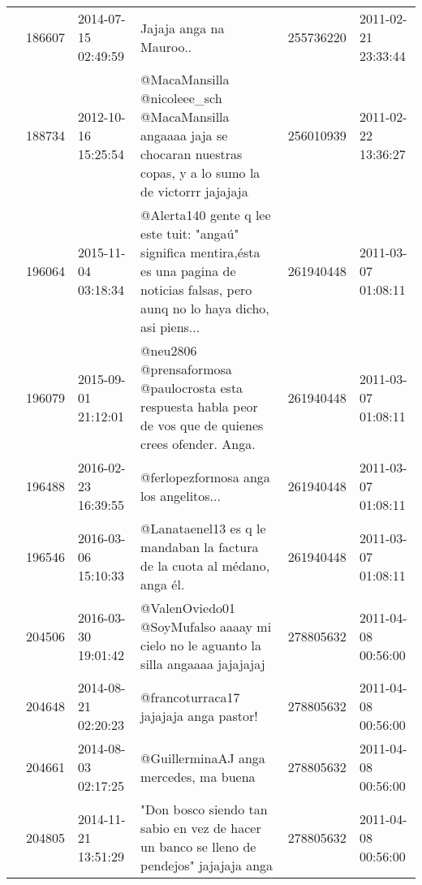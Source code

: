 \begin{tabular}{llllrl}
           & 186607  & 2014-07-15 02:49:59 &                                                                                                                      Jajaja anga na Mauroo.. &   255736220 & 2011-02-21 23:33:44 \\
           & 188734  & 2012-10-16 15:25:54 &                       @MacaMansilla @nicoleee\_sch @MacaMansilla angaaaa jaja se chocaran nuestras copas, y a lo sumo la de victorrr jajajaja &   256010939 & 2011-02-22 13:36:27 \\
           & 196064  & 2015-11-04 03:18:34 &  @Alerta140 gente q lee este tuit: "angaú" significa mentira,ésta es una pagina de noticias falsas, pero aunq no lo haya dicho, asi piens... &   261940448 & 2011-03-07 01:08:11 \\
           & 196079  & 2015-09-01 21:12:01 &                                    @neu2806 @prensaformosa @paulocrosta esta respuesta habla peor de vos que de quienes crees ofender. Anga. &   261940448 & 2011-03-07 01:08:11 \\
           & 196488  & 2016-02-23 16:39:55 &                                                                                                       @ferlopezformosa anga los angelitos... &   261940448 & 2011-03-07 01:08:11 \\
           & 196546  & 2016-03-06 15:10:33 &                                                                    @Lanataenel13 es q le mandaban la factura de la cuota al médano, anga él. &   261940448 & 2011-03-07 01:08:11 \\
           & 204506  & 2016-03-30 19:01:42 &                                                           @ValenOviedo01 @SoyMufalso aaaay mi cielo no le aguanto la silla angaaaa jajajajaj &   278805632 & 2011-04-08 00:56:00 \\
           & 204648  & 2014-08-21 02:20:23 &                                                                                                       @francoturraca17 jajajaja anga pastor! &   278805632 & 2011-04-08 00:56:00 \\
           & 204661  & 2014-08-03 02:17:25 &                                                                                                       @GuillerminaAJ anga mercedes, ma buena &   278805632 & 2011-04-08 00:56:00 \\
           & 204805  & 2014-11-21 13:51:29 &                                                     "Don bosco siendo tan sabio en vez de hacer un banco se lleno de pendejos" jajajaja anga &   278805632 & 2011-04-08 00:56:00 \\

\end{tabular}
